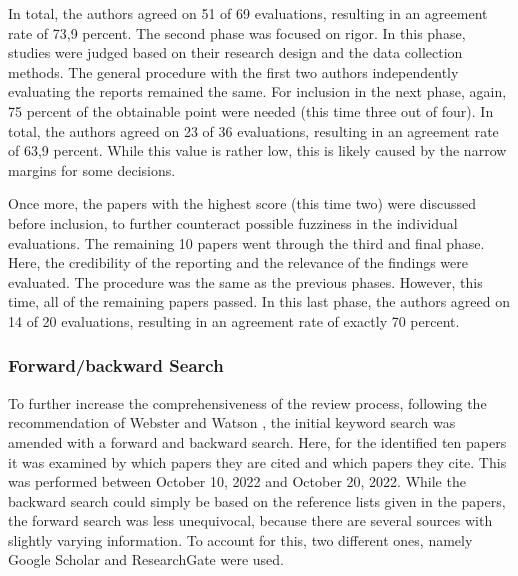 \documentclass{bmcart}
\begin{document}


In total, the authors agreed on 51 of 69 evaluations, resulting in an agreement rate of 73,9 percent. The second phase was focused on rigor. In this phase, studies were judged based on their research design and the data collection methods. The general procedure with the first two authors independently evaluating the reports remained the same. For inclusion in the next phase, again, 75 percent of the obtainable point were needed (this time three out of four). In total, the authors agreed on 23 of 36 evaluations, resulting in an agreement rate of 63,9 percent. While this value is rather low, this is likely caused by the narrow margins for some decisions. 

Once more, the papers with the highest score (this time two) were discussed before inclusion, to further counteract possible fuzziness in the individual evaluations.  The remaining 10 papers went through the third and final phase. Here, the credibility of the reporting and the relevance of the findings were evaluated. The procedure was the same as the previous phases. However, this time, all of the remaining papers passed. In this last phase, the authors agreed on 14 of 20 evaluations, resulting in an agreement rate of exactly 70 percent. 










\subsubsection{Forward/backward Search}

To further increase the comprehensiveness of the review process, following the recommendation of Webster and Watson \cite{webster2002analyzing}, the initial keyword search was amended with a forward and backward search. Here, for the identified ten papers it was examined by which papers they are cited and which papers they cite. This was performed between October 10, 2022 and October 20, 2022. While the backward search could simply be based on the reference lists given in the papers, the forward search was less unequivocal, because there are several sources with slightly varying information. To account for this, two different ones, namely Google Scholar and ResearchGate were used. 
\end{document}

